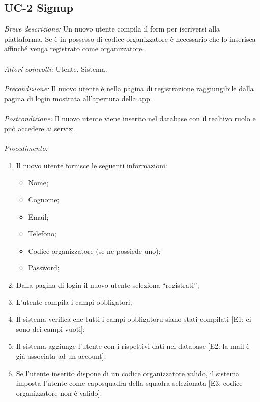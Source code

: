 \subsection{UC-2 Signup}
\textit{Breve descrizione:} Un nuovo utente compila il form per iscriversi alla piattaforma. Se è in possesso di codice organizzatore è necessario che lo inserisca affinché venga registrato come organizzatore.
\\
\\
\textit{Attori coinvolti:} Utente, Sistema.
\\
\\
\textit{Precondizione:} Il nuovo utente è nella pagina di registrazione raggiungibile dalla pagina di login mostrata all'apertura della app.
\\
\\
\textit{Postcondizione:} Il nuovo utente viene inserito nel database con il realtivo ruolo e può accedere ai servizi.
\\
\\
\textit{Procedimento:}
\begin{enumerate}
	\item Il nuovo utente fornisce le seguenti informazioni:
	\begin{itemize}
		\item Nome;
		\item Cognome;
		\item Email;
		\item Telefono;
		\item Codice organizzatore (se ne possiede uno);
		\item Password;
	\end{itemize}
	\item Dalla pagina di login il nuovo utente seleziona ``registrati'';
	\item L'utente compila i campi obbligatori;
	\item Il sistema verifica che tutti i campi obbligatoru siano stati compilati [E1: ci sono dei campi vuoti];
	\item Il sistema aggiunge l'utente con i rispettivi dati nel database [E2: la mail è già associata ad un account];
	\item Se l'utente inserito dispone di un codice organizzatore valido, il sistema imposta l'utente come caposquadra della squadra selezionata [E3: codice organizzatore non è valido].
\end{enumerate}


